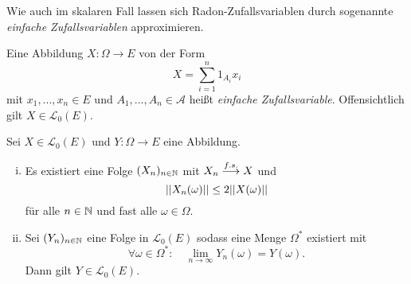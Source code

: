 Wie auch im skalaren Fall lassen sich Radon-Zufallsvariablen durch sogenannte \textit{einfache Zufallsvariablen} approximieren. 

\begin{mydef}
    Eine Abbildung $X:\Omega \to E$ von der Form 
    $$
        X = \sum_{i=1}^n 1_{A_i}x_i
    $$
    mit $x_1,...,x_n \in E$ und $A_1,..., A_n \in \mathcal{A}$ heißt \textit{einfache Zufallsvariable}. Offensichtlich gilt $X \in \mathcal{L}_0(E)$. 
\end{mydef}


\begin{proposition}
    Sei $X \in \mathcal{L}_0(E)$ und $Y: \Omega \to E$ eine Abbildung. 
    \begin{enumerate}[(i)]
        \item Es existiert eine Folge $(X_n)_{n \in \mathbb{N}}$ mit $X_n \overset{f.s.}{\longrightarrow} X$ und 
        $$
            \lvert\lvert X_n(\omega) \rvert\rvert \leq 2 \lvert\lvert X(\omega) \rvert\rvert
        $$
        für alle $n \in \mathbb{N}$ und fast alle $\omega \in \Omega$. 
        \item Sei $(Y_n)_{n \in \mathbb{N}}$ eine Folge in $\mathcal{L}_0(E)$ sodass eine Menge $\Omega^*$ existiert mit 
        $$
            \forall \omega \in \Omega^*: \quad \lim_{n \to \infty}Y_n(\omega) = Y(\omega). 
        $$
        Dann gilt $Y \in \mathcal{L}_0(E)$. 
    \end{enumerate}
\end{proposition}

